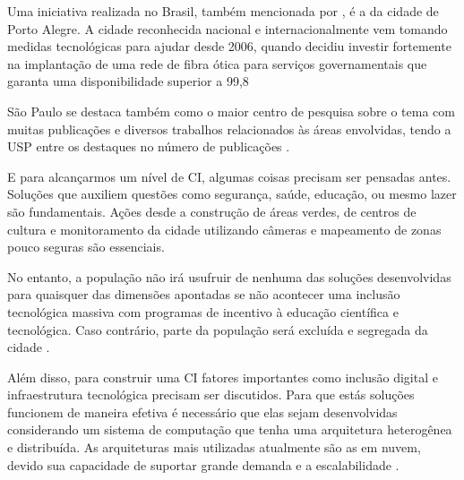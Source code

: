 Uma iniciativa realizada no Brasil, também mencionada por , é a da cidade de Porto Alegre. A cidade reconhecida nacional e internacionalmente vem tomando medidas tecnológicas para ajudar desde 2006, quando decidiu investir fortemente na implantação de uma rede de fibra ótica para serviços governamentais que garanta uma disponibilidade superior a 99,8%


 São Paulo se destaca também como o maior centro de pesquisa sobre o tema com muitas publicações e diversos trabalhos relacionados às áreas envolvidas, tendo a USP entre os destaques no número de publicações \cite{lazzaretti}. 


E para alcançarmos um nível de CI, algumas coisas precisam ser pensadas antes. Soluções que auxiliem questões como segurança, saúde, educação, ou mesmo lazer são fundamentais. Ações desde a construção de áreas verdes, de centros de cultura e monitoramento da cidade utilizando câmeras e mapeamento de zonas pouco seguras são essenciais. 

No entanto, a população não irá usufruir de nenhuma das soluções desenvolvidas para quaisquer das dimensões apontadas se não acontecer uma inclusão tecnológica massiva com programas de incentivo à educação científica e tecnológica. Caso contrário, parte da população será excluída e segregada da cidade \cite{patricia}.

Além disso, para construir uma CI fatores importantes como inclusão digital e infraestrutura tecnológica precisam ser discutidos. Para que estás soluções funcionem de maneira efetiva é necessário que elas sejam desenvolvidas considerando um sistema de computação que tenha uma arquitetura heterogênea e distribuída. As arquiteturas mais utilizadas atualmente são as em nuvem, devido sua capacidade de suportar grande demanda e a escalabilidade \cite{patricia}. 

